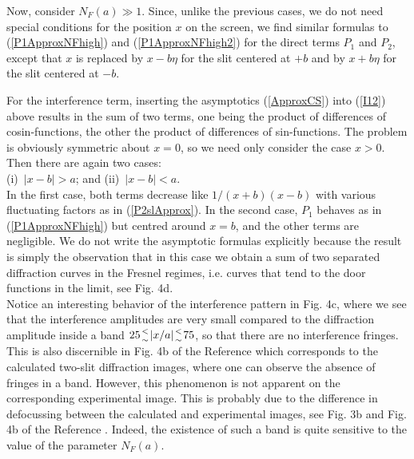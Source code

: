 \documentclass[12pt]{article}   %
\begin{document}
Now, consider $N_F(a)\gg 1$. Since, unlike the previous cases, we
do not need special conditions for the position $x$ on the screen,
we find similar formulas to (\ref{P1ApproxNFhigh}) and
(\ref{P1ApproxNFhigh2}) for the direct terms $P_1$ and $P_2$,
except that $x$ is replaced by $x-b\eta$ for the slit centered at
$+b$ and by $x+b\eta$ for the slit centered at $-b$.

For the interference term, inserting the asymptotics (\ref{ApproxCS})
into (\ref{I12}) above results in the sum of two terms, one being
the product of differences of cosin-functions, the other the product
of differences of sin-functions. The problem is obviously
symmetric about $x=0$, so we need only
consider the case $x>0$. Then there are again two cases: \\
(i)\ $|x-b| > a$; and (ii)\ $|x-b| < a$. \\
In the first case, both terms decrease like $1/(x+b)(x-b)$ with
various fluctuating factors as in (\ref{P2slApprox}). In the
second case, $P_1$ behaves as in (\ref{P1ApproxNFhigh}) but
centred around $x=b$, and the other terms are negligible. We do
not write the asymptotic formulas explicitly because the result is
simply the observation that in this case we obtain a sum of two
separated diffraction curves in the Fresnel regimes,
i.e. curves that tend to the door functions in the limit, see Fig. 4d.\\

Notice an interesting behavior of the interference pattern in Fig.
4c, where we see that the interference amplitudes are very small
compared to the diffraction amplitude inside a band $25 {< \atop
\sim} |x/a| {< \atop \sim} 75$, so that there are no interference
fringes. This is also discernible in Fig. 4b of the Reference\cite{Frabboni}
which corresponds to the calculated two-slit diffraction images,
where one can observe the absence of fringes in a band. However,
this phenomenon is not apparent on the corresponding experimental
image. This is probably due to the difference in defocussing
between the calculated and experimental images, see Fig. 3b and
Fig. 4b of the Reference \cite{Frabboni}. Indeed, the existence of such a band
is quite sensitive to the value of the parameter $N_F(a)$.
\end{document}
